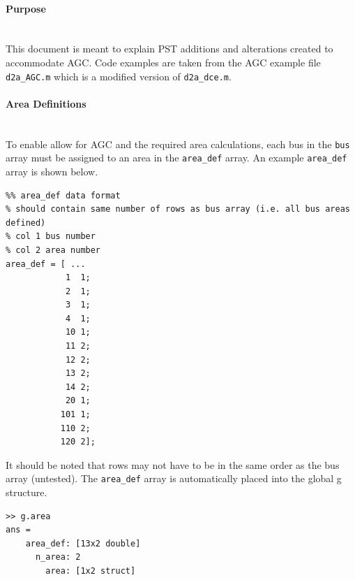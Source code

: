 \documentclass[12pt]{article}
\begin{document}
\onehalfspacing
\paragraph{Purpose} \ \\
This document is meant to explain PST additions and alterations created to accommodate AGC.
Code examples are taken from the AGC example file \verb|d2a_AGC.m| which is a modified version of \verb|d2a_dce.m|.


\paragraph{Area Definitions} \ \\
To enable allow for AGC and the required area calculations, each bus  in the \verb|bus| array must be assigned to an area in the \verb|area_def| array.
An example \verb|area_def| array is shown below.
\begin{verbatim}
%% area_def data format
% should contain same number of rows as bus array (i.e. all bus areas defined)
% col 1 bus number
% col 2 area number
area_def = [ ...
            1  1;
            2  1;
            3  1;
            4  1;
            10 1;
            11 2;
            12 2;
            13 2;
            14 2; 
            20 1;
           101 1; 
           110 2;
           120 2];
\end{verbatim}

It should be noted that rows may not have to be in the same order as the bus array (untested).
The \verb|area_def| array is automatically placed into the global g structure.
\begin{verbatim}
>> g.area
ans = 
    area_def: [13x2 double]
      n_area: 2
        area: [1x2 struct]
\end{verbatim}
\end{document}
